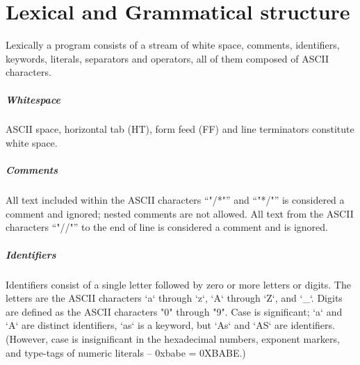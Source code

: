 \chapter{Lexical and Grammatical structure}


Lexically a program consists of a stream of white space, comments,
identifiers, keywords, literals, separators and operators, all of them
composed of ASCII characters. 

\paragraph{Whitespace}
ASCII space, horizontal tab (HT), form feed (FF) and line
terminators constitute white space.

\paragraph{Comments}
All text included within the ASCII characters ``\xcd"/*"'' and
``\xcd"*/"'' is
considered a comment and ignored; nested comments are not
allowed.  All text from the ASCII characters
``\xcd"//"'' to the end of line is considered a comment and is ignored.

\paragraph{Identifiers}

Identifiers consist of a single letter followed by zero or more letters or
digits. The letters are the ASCII characters \xcd`a` through \xcd`z`, \xcd`A`
through \xcd`Z`, and \xcd`_`. Digits are defined as the ASCII characters
\xcd"0" through \xcd"9". Case is significant; \xcd`a` and \xcd`A` are distinct
identifiers, \xcd`as` is a keyword, but \xcd`As` and \xcd`AS` are identifiers.
(However, case is insignificant in the hexadecimal numbers, exponent markers,
and type-tags of numeric literals -- 0xbabe = 0XBABE.)

